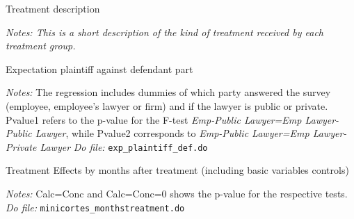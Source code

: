 \documentclass[11pt]{article}
\begin{document}


\begin{table}[H]
   \caption{Treatment description}
    \label{treatment_description}
    \begin{center}
    \scriptsize{}
    \end{center}
    \footnotesize
    \textit{Notes: This is a short description of the kind of treatment received by each treatment group.} 
\end{table}

\begin{landscape}

\begin{table}[H]
\caption{Expectation plaintiff against defendant part}
\label{Table_exp_plaintiff_def}
\begin{center}
\scriptsize{}
\end{center}
 \footnotesize
\textit{Notes:} 
The regression includes dummies of which party answered the survey (employee, employee's lawyer or firm) and if the lawyer is public or private. Pvalue1 refers to the p-value for the F-test \emph{ Emp-Public Lawyer=Emp Lawyer-Public Lawyer}, while Pvalue2 corresponds to \emph{ Emp-Public Lawyer=Emp Lawyer-Private Lawyer}
\textit{Do file: } \texttt{exp\_plaintiff\_def.do}
\end{table}

\end{landscape}

\begin{table}[H]
    \caption{Treatment Effects by months after treatment (including basic variables controls)}
    \label{Table_effects}
    \begin{center}
    \scriptsize{}
    \end{center}
    \footnotesize
    \textit{Notes:} 
    Calc=Conc and Calc=Conc=0 shows the p-value for the respective tests.
    \textit{Do file: } \texttt{minicortes\_monthstreatment.do}
\end{table}
\end{document}
